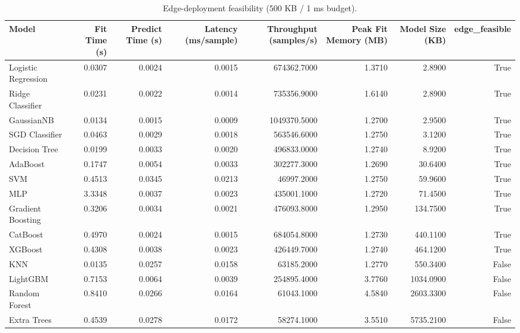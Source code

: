 \begin{table}
\caption{Edge-deployment feasibility (500 KB / 1 ms budget).}
\label{tab:deploy}
\begin{tabular}{lrrrrrrr}
\toprule
Model & Fit Time (s) & Predict Time (s) & Latency (ms/sample) & Throughput (samples/s) & Peak Fit Memory (MB) & Model Size (KB) & edge\_feasible \\
\midrule
Logistic Regression & 0.0307 & 0.0024 & 0.0015 & 674362.7000 & 1.3710 & 2.8900 & True \\
Ridge Classifier & 0.0231 & 0.0022 & 0.0014 & 735356.9000 & 1.6140 & 2.8900 & True \\
GaussianNB & 0.0134 & 0.0015 & 0.0009 & 1049370.5000 & 1.2700 & 2.9500 & True \\
SGD Classifier & 0.0463 & 0.0029 & 0.0018 & 563546.6000 & 1.2750 & 3.1200 & True \\
Decision Tree & 0.0199 & 0.0033 & 0.0020 & 496833.0000 & 1.2740 & 8.9200 & True \\
AdaBoost & 0.1747 & 0.0054 & 0.0033 & 302277.3000 & 1.2690 & 30.6400 & True \\
SVM & 0.4513 & 0.0345 & 0.0213 & 46997.2000 & 1.2750 & 59.9600 & True \\
MLP & 3.3348 & 0.0037 & 0.0023 & 435001.1000 & 1.2720 & 71.4500 & True \\
Gradient Boosting & 0.3206 & 0.0034 & 0.0021 & 476093.8000 & 1.2950 & 134.7500 & True \\
CatBoost & 0.4970 & 0.0024 & 0.0015 & 684054.8000 & 1.2730 & 440.1100 & True \\
XGBoost & 0.4308 & 0.0038 & 0.0023 & 426449.7000 & 1.2740 & 464.1200 & True \\
KNN & 0.0135 & 0.0257 & 0.0158 & 63185.2000 & 1.2770 & 550.3400 & False \\
LightGBM & 0.7153 & 0.0064 & 0.0039 & 254895.4000 & 3.7760 & 1034.0900 & False \\
Random Forest & 0.8410 & 0.0266 & 0.0164 & 61043.1000 & 4.5840 & 2603.3300 & False \\
Extra Trees & 0.4539 & 0.0278 & 0.0172 & 58274.1000 & 3.5510 & 5735.2100 & False \\
\bottomrule
\end{tabular}
\end{table}

